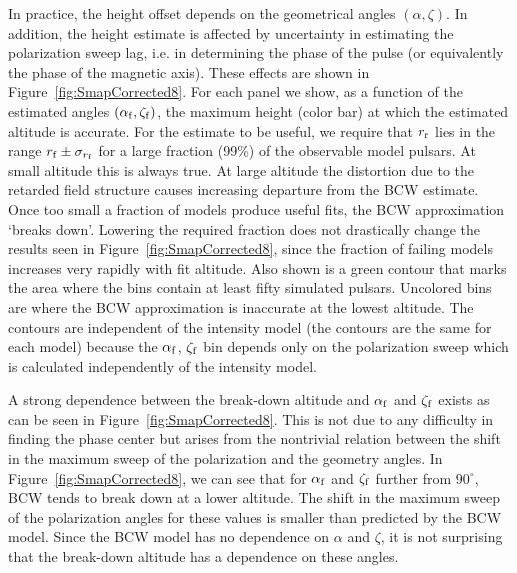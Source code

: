 	In practice, the height offset depends on the geometrical angles 
$(\alpha, \zeta)$. In addition, the height estimate is affected by uncertainty
in estimating the polarization sweep lag, i.e. in determining the phase of the pulse 
(or equivalently the phase of the magnetic axis). These effects are shown in 
Figure~\ref{fig:SmapCorrected8}. For each panel we show, as a function of the estimated angles
$(\alpha_{\rm{f}}, \zeta_{\rm{f}})$, the maximum height (color bar) at which the estimated altitude is
accurate. For the estimate to be useful, we require that $r_{\rm{r}}$ lies in
the range $r_{\rm{f}}\pm\sigma_{r_{\rm{f}}}$ for a large fraction (99\%) of the observable
model pulsars. At small altitude this is always true. At large altitude
the distortion due to the retarded field structure causes increasing
departure from the BCW estimate. Once too small a fraction of models produce
useful fits, the BCW approximation `breaks down'.  Lowering the required fraction
does not drastically change the results seen in Figure~\ref{fig:SmapCorrected8}, since
the fraction of failing models increases very rapidly with fit altitude. Also shown
is a green contour that marks the area where the bins contain at least
fifty simulated pulsars.  Uncolored bins are where the BCW approximation is
inaccurate at the lowest altitude.  The contours are independent 
of the intensity model (the contours are the same for each model) because
the $\alpha_{\rm{f}}$, $\zeta_{\rm{f}}$ bin
depends only on the polarization sweep which is calculated independently
of the intensity model.

A strong dependence between the break-down altitude and $\alpha_{\rm{f}}$ and $\zeta_{\rm{f}}$ exists as can 
be seen in Figure~\ref{fig:SmapCorrected8}.  This is not due to any
difficulty in finding the phase center but arises from the nontrivial relation between
the shift in the maximum sweep of the polarization and the geometry angles.
In Figure~\ref{fig:SmapCorrected8}, we can see that for $\alpha_{\rm{f}}$ and $\zeta_{\rm{f}}$
further from $90^\circ$, BCW tends to break down at a lower altitude.  
The shift in the maximum sweep of the polarization angles for these values is smaller
than predicted by the BCW model. Since the BCW model has no dependence on
$\alpha$ and $\zeta$, it is not surprising that the break-down altitude has 
a dependence on these angles.

